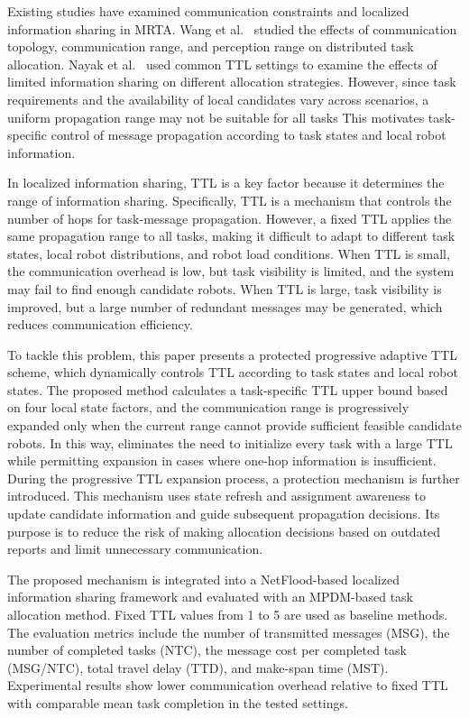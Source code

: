 \documentclass[type=submission,name=IR]{oae}
\begin{document}
Existing studies have examined communication constraints and localized information sharing in MRTA. Wang et al.~\cite{wang_eepi} studied the effects of communication topology, communication range, and perception range on distributed task allocation. Nayak et al.~\cite{nayak2025limited} used common TTL settings to examine the effects of limited information sharing on different allocation strategies. 
 However, since task requirements and the availability of local candidates vary across scenarios, a uniform propagation range may not be suitable for all tasks This motivates task-specific control of message propagation according to task states and local robot information.

In localized information sharing, TTL is a key factor because it determines the range of information sharing. Specifically, TTL is a mechanism that controls the number of hops for task-message propagation. However, a fixed TTL applies the same propagation range to all tasks, making it difficult to adapt to different task states, local robot distributions, and robot load conditions. When TTL is small, the communication overhead is low, but task visibility is limited, and the system may fail to find enough candidate robots. When TTL is large, task visibility is improved, but a large number of redundant messages may be generated, which reduces communication efficiency.

To tackle this problem, this paper presents a protected progressive adaptive TTL scheme, which dynamically controls TTL according to task states and local robot states. The proposed method calculates a task-specific TTL upper bound based on four local state factors, and the communication range is progressively expanded only when the current range cannot provide sufficient feasible candidate robots. In this way, eliminates the need to initialize every task with a large TTL while permitting expansion in cases where one-hop information is insufficient. During the progressive TTL expansion process, a protection mechanism is further introduced. This mechanism uses state refresh and assignment awareness to update candidate information and guide subsequent propagation decisions. Its purpose is to reduce the risk of making allocation decisions based on outdated reports and limit unnecessary communication.

The proposed mechanism is integrated into a NetFlood-based localized information sharing framework and evaluated with an MPDM-based task allocation method. Fixed TTL values from 1 to 5 are used as baseline methods. The evaluation metrics include the number of transmitted messages (MSG), the number of completed tasks (NTC), the message cost per completed task (MSG/NTC), total travel delay (TTD), and make-span time (MST). Experimental results show lower communication overhead relative to fixed TTL with comparable mean task completion in the tested settings. 
\end{document}
